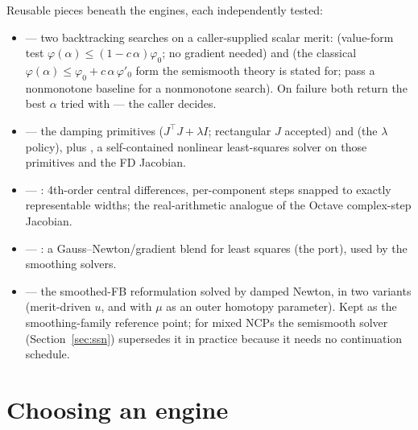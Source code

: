 Reusable pieces beneath the engines, each independently tested:

\begin{itemize}
\item {} --- two backtracking searches on a caller-supplied
  scalar merit:  (value-form test
  $\varphi(\alpha) \le (1 - c\,\alpha)\varphi_0$; no gradient needed) and
   (the classical
  $\varphi(\alpha) \le \varphi_0 + c\,\alpha\,\varphi'_0$ form the
  semismooth theory is stated for; pass a nonmonotone baseline for a
  nonmonotone search). On failure both return the best $\alpha$ tried with
   --- the caller decides.
\item {} --- the damping primitives
   ($J^\top J + \lambda I$; rectangular $J$
  accepted) and  (the $\lambda$ policy), plus
  , a self-contained nonlinear least-squares
  solver on those primitives and the FD Jacobian.
\item {} --- : 4th-order
  central differences, per-component steps snapped to exactly representable
  widths; the real-arithmetic analogue of the Octave complex-step Jacobian.
\item {} --- : a
  Gauss--Newton/gradient blend for least squares (the 
  port), used by the smoothing solvers.
\item {} --- the smoothed-FB reformulation solved by
  damped Newton, in two variants (merit-driven $u$, and
   with $\mu$ as an outer homotopy
  parameter). Kept as the smoothing-family reference point; for mixed NCPs
  the semismooth solver (Section~\ref{sec:ssn}) supersedes it in practice
  because it needs no continuation schedule.
\end{itemize}

\section{Choosing an engine}
\label{sec:choosing}


